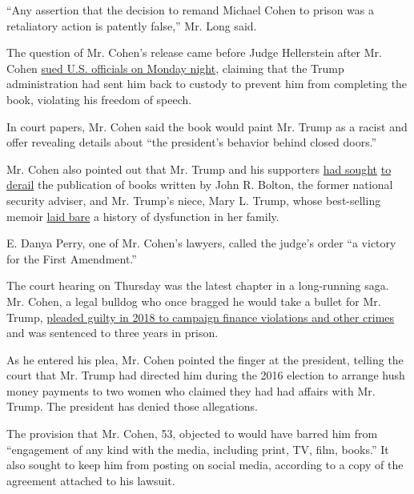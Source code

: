 ``Any assertion that the decision to remand Michael Cohen to prison was
a retaliatory action is patently false,'' Mr. Long said.

The question of Mr. Cohen's release came before Judge Hellerstein after
Mr. Cohen
\href{https://www.nytimes3xbfgragh.onion/2020/07/21/nyregion/michael-cohen-trump-book.html?searchResultPosition=1}{sued
U.S. officials on Monday night}, claiming that the Trump administration
had sent him back to custody to prevent him from completing the book,
violating his freedom of speech.

In court papers, Mr. Cohen said the book would paint Mr. Trump as a
racist and offer revealing details about ``the president's behavior
behind closed doors.''

Mr. Cohen also pointed out that Mr. Trump and his supporters
\href{https://www.nytimes3xbfgragh.onion/2020/06/20/us/politics/john-bolton-book-ruling.html}{had
sought}
\href{https://www.nytimes3xbfgragh.onion/2020/07/13/us/politics/mary-trump-book.html}{to
derail} the publication of books written by John R. Bolton, the former
national security adviser, and Mr. Trump's niece, Mary L. Trump, whose
best-selling memoir
\href{https://www.nytimes3xbfgragh.onion/2020/07/08/books/review/mary-trump-book-takeaways.html}{laid
bare} a history of dysfunction in her family.

E. Danya Perry, one of Mr. Cohen's lawyers, called the judge's order ``a
victory for the First Amendment.''

The court hearing on Thursday was the latest chapter in a long-running
saga. Mr. Cohen, a legal bulldog who once bragged he would take a bullet
for Mr. Trump,
\href{https://slack-redir.net/link?url=https\%3A\%2F\%2Fwww.nytimes3xbfgragh.onion\%2F2018\%2F08\%2F21\%2Fnyregion\%2Fmichael-cohen-guilty-plea-trump-takeaways.html}{pleaded
guilty in 2018 to campaign finance violations and other crimes} and was
sentenced to three years in prison.

As he entered his plea, Mr. Cohen pointed the finger at the president,
telling the court that Mr. Trump had directed him during the 2016
election to arrange hush money payments to two women who claimed they
had had affairs with Mr. Trump. The president has denied those
allegations.

The provision that Mr. Cohen, 53, objected to would have barred him from
``engagement of any kind with the media, including print, TV, film,
books.'' It also sought to keep him from posting on social media,
according to a copy of the agreement attached to his lawsuit.

